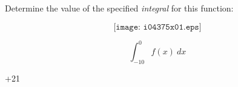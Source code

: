 

Determine the value of the specified {\it integral} for this function:

$$\texttt{[image: i04375x01.eps]}$$

$$\int_{-10}^{0} f(x) \> dx$$







+21











